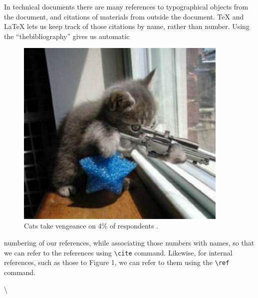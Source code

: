 \documentclass[12pt]{article}
\begin{document}
In technical documents there are many references to typographical objects from the document, and citations of materials from outside the document. \TeX \cite{ref1} and \LaTeX \cite{ref2} lets us keep track of those citations by name, rather than number. Using the ``thebibliography'' gives us automatic
\begin{figure}[h!]
\centering
\includegraphics[width=4in]{sniper.jpg}
\caption{Cats take vengeance on 4\% of respondents \cite{ref3}.}
\label{fig:cat}
\end{figure}
numbering of our references, while associating those numbers with names, so that we can refer to the references using \verb|\cite| command. Likewise, for internal references, such as those to Figure 1, we can refer to them using the \verb|\ref| command.

\textbackslash



\end{document}
